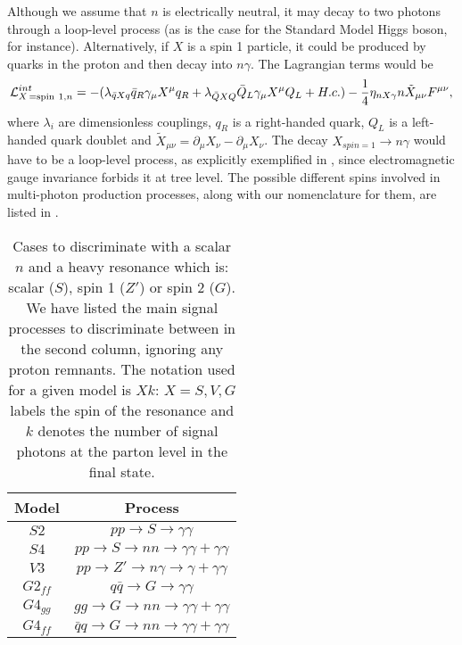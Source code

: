 Although we assume that $n$ is electrically neutral, it may decay to two
photons through a loop-level process (as is the case for the Standard Model
Higgs boson, for instance). 
Alternatively, if $X$ is a spin 1 particle, it could be produced by
quarks in the proton and then decay into $n \gamma$. 
The Lagrangian terms would be
\begin{equation}
\mathcal{L}^{int}_{X\,={\rm spin~1},n}= -
                                     (\lambda_{\bar q X q} \bar q_R \gamma_\mu
                                     X^\mu q_R
 + \lambda_{\bar Q X Q} \bar Q_L \gamma_\mu X^\mu Q_L + H.c.)
-\frac{1}{4}\eta_{nX\gamma}
                                     n{\tilde X}_{\mu\nu}F^{\mu\nu},
                                     \label{eq:wouldbe}
\end{equation}
where  $\lambda_i$ are  dimensionless
couplings, $q_R$ is a right-handed quark, $Q_L$ is a left-handed quark doublet
and ${\tilde X}_{\mu \nu}=\partial _\mu
X_\nu - \partial_\mu X_\nu$. 
The decay $X_{spin=1}\rightarrow n \gamma$ would
have to be a loop-level process, as explicitly exemplified in
, since electromagnetic gauge invariance 
forbids it at tree level. 
The possible different spins involved in multi-photon production processes, along with our nomenclature for them, are listed in . 
\begin{table}\begin{center}
\begin{tabular}{|c|c|}\hline
Model & Process \\ \hline
$S2$ & $pp \rightarrow S \rightarrow \gamma \gamma$ \\
$S4$ & $pp \rightarrow S \rightarrow nn \rightarrow \gamma
       \gamma+\gamma\gamma$ \\ 
$V3$ & $pp \rightarrow Z' \rightarrow n \gamma \rightarrow \gamma + \gamma
       \gamma$ \\
$G2_{ff}$ & $q \bar q \rightarrow G \rightarrow \gamma \gamma$ \\ 
$G4_{gg}$ & $gg \rightarrow G \rightarrow nn \rightarrow \gamma \gamma+\gamma
            \gamma$ \\
$G4_{ff}$ & $\bar q q \rightarrow G \rightarrow nn \rightarrow \gamma \gamma+\gamma
            \gamma$ \\
\hline
\end{tabular}
\end{center}
\caption{\label{tab:cases} Cases to discriminate with a scalar $n$ and a heavy
resonance which is: scalar ($S$), spin 1 ($Z'$) or spin 2 ($G$). We have
listed the main signal processes to discriminate between in the second column,
ignoring any proton remnants. The notation used for a given model is $Xk$:
$X=S,V,G$ labels the spin of the resonance and $k$ denotes the number of
signal photons at the parton level in the final state.} 
\end{table}
